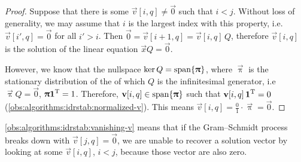 \begin{proof}
  Suppose that there is some $\vec{v}[i, q] \ne \vec{0}$ such that $i
  < j$. Without loss of generality, we may assume that $i$ is the
  largest index with this property, i.e.~$\vec{v}[i', q] = \vec{0}$
  for all $i' > i$. Then $\vec{0} = \vec{v}[i + 1, q] = \vec{v}[i, q]
  \, Q$, therefore $\vec{v}[i, q]$ is the solution of the linear
  equation $\vec{x} Q = \vec{0}$.

  However, we know that the nullspace
  $\ker Q = \operatorname{span} \{ \bm{\mathrm{\uppi}} \}$, where $\vec{\uppi}$ is the
  stationary distribution of the  of which $Q$ is the
  infinitesimal generator, i.e~$\vec{\uppi} Q = \vec{0}$,
  $\bm{\mathrm{\uppi}} \bm{\mathrm{1}}^{\mathrm{T}} = 1$. Therefore,
  $\bm{\mathrm{v}}[i, q] \in \operatorname{span} \{ \bm{\mathrm{\uppi}} \}$ such that
  $\bm{\mathrm{v}}[i, q] \, \bm{\mathrm{1}}^{\mathrm{T}} = 0$
  (\cref{obs:algorithms:idrstab:normalized-v}). This means
  $\vec{v}[i, q] = \frac{0}{1} \cdot \vec{\uppi} = \vec{0}$.
\end{proof}

\cref{obs:algorithms:idrstab:vanishing-v} means that if the
Gram--Schmidt process breaks down with $\vec{v}[j, q] = \vec{0}$, we
are unable to recover a solution vector by looking at some $\vec{v}[i,
q]$, $i < j$, because those vector are also zero.

